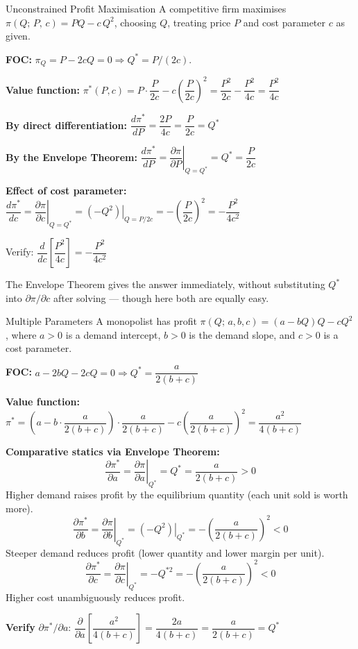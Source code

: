 \documentclass[12pt, a4paper]{article}
\theoremstyle{definition}
\newcommand{\ddd}[2]{\dfrac{d#1}{d#2}}
\newcommand{\pp}[2]{\dfrac{\partial #1}{\partial #2}}
\begin{document}
\begin{exbox}{Unconstrained Profit Maximisation}
A competitive firm maximises $\pi(Q;\,P,\,c) = PQ - c\,Q^2$, choosing $Q$,
treating price $P$ and cost parameter $c$ as given.

\textbf{FOC:} $\pi_Q = P - 2cQ = 0 \Rightarrow Q^* = P/(2c)$.

\textbf{Value function:}
$\pi^*(P,c) = P\cdot\dfrac{P}{2c} - c\left(\dfrac{P}{2c}\right)^2
= \dfrac{P^2}{2c} - \dfrac{P^2}{4c} = \dfrac{P^2}{4c}$

\textbf{By direct differentiation:}
$\ddd{\pi^*}{P} = \dfrac{2P}{4c} = \dfrac{P}{2c} = Q^*$ \checkmark

\textbf{By the Envelope Theorem:}
$\ddd{\pi^*}{P} = \left.\pp{\pi}{P}\right|_{Q=Q^*} = Q^* = \dfrac{P}{2c}$ \checkmark

\textbf{Effect of cost parameter:}
$\ddd{\pi^*}{c}
= \left.\pp{\pi}{c}\right|_{Q=Q^*}
= \left.(-Q^2)\right|_{Q=P/2c}
= -\left(\dfrac{P}{2c}\right)^2 = -\dfrac{P^2}{4c^2}$

Verify: $\ddd{}{c}\!\left[\dfrac{P^2}{4c}\right] = -\dfrac{P^2}{4c^2}$ \checkmark

The Envelope Theorem gives the answer immediately, without substituting
$Q^*$ into $\partial\pi/\partial c$ after solving --- though here both are
equally easy.
\end{exbox}

\begin{exbox}{Multiple Parameters}
A monopolist has profit $\pi(Q;\,a,b,c) = (a-bQ)Q - cQ^2$, where $a>0$
is a demand intercept, $b>0$ is the demand slope, and $c>0$ is a cost
parameter.

\textbf{FOC:} $a - 2bQ - 2cQ = 0 \Rightarrow Q^* = \dfrac{a}{2(b+c)}$

\textbf{Value function:}
$\pi^* = \left(a - b\cdot\dfrac{a}{2(b+c)}\right)\cdot\dfrac{a}{2(b+c)}
         - c\left(\dfrac{a}{2(b+c)}\right)^2
       = \dfrac{a^2}{4(b+c)}$

\textbf{Comparative statics via Envelope Theorem:}
\[
  \pp{\pi^*}{a} = \left.\pp{\pi}{a}\right|_{Q^*}
  = Q^* = \frac{a}{2(b+c)} > 0
\]
Higher demand raises profit by the equilibrium quantity (each unit sold is
worth more).
\[
  \pp{\pi^*}{b} = \left.\pp{\pi}{b}\right|_{Q^*}
  = \left.(-Q^2)\right|_{Q^*}
  = -\left(\frac{a}{2(b+c)}\right)^2 < 0
\]
Steeper demand reduces profit (lower quantity and lower margin per unit).
\[
  \pp{\pi^*}{c} = \left.\pp{\pi}{c}\right|_{Q^*}
  = -Q^{*2} = -\left(\frac{a}{2(b+c)}\right)^2 < 0
\]
Higher cost unambiguously reduces profit.

\textbf{Verify} $\partial\pi^*/\partial a$:
$\dfrac{\partial}{\partial a}\!\left[\dfrac{a^2}{4(b+c)}\right]
= \dfrac{2a}{4(b+c)} = \dfrac{a}{2(b+c)} = Q^*$ \checkmark
\end{exbox}
\end{document}
